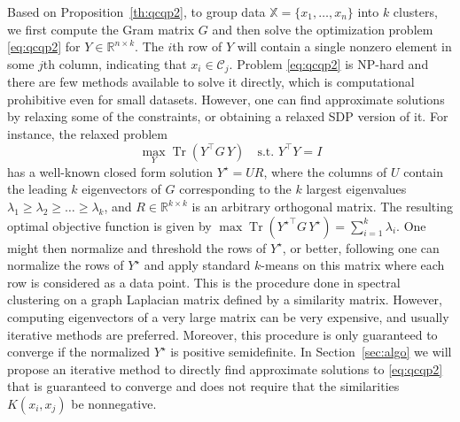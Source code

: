 \documentclass[aps,preprint,nofootinbib,floatfix]{revtex4-1}
\DeclareMathOperator{\Tr}{Tr}
\newcommand\kk{K}
\newcommand\C{{\mathcal{C}}}
\newcommand\Zt{Y}
\begin{document}
Based on Proposition~\ref{th:qcqp2}, to group data
$\mathbb{X} = \{ x_1,\dotsc,x_n \}$
into  $k$ clusters, we first compute the Gram matrix
$G$ and then 
solve the optimization problem \eqref{eq:qcqp2} for $\Zt \in
\mathbb{R}^{n\times k}$. The $i$th row
of $\Zt$ will contain a single nonzero element in some $j$th column,
indicating that $x_i \in \C_j$. 
Problem \eqref{eq:qcqp2} is NP-hard and there
are few methods
available to solve it directly,
which is computational prohibitive even for small datasets.
However, one can find approximate solutions by relaxing some 
of the constraints, or obtaining a relaxed SDP version of it.
For instance, the relaxed problem
\begin{equation}
\max_{Y} \Tr \left( Y^\top G \, Y \right) \quad \mbox{s.t. $Y^\top Y = I$}
\end{equation}
has a well-known closed form solution $Y^\star = U R$, where the
columns of $U$ contain the leading $k$ eigenvectors of $G$ corresponding
to the $k$ largest eigenvalues $\lambda_1\ge \lambda_2\ge\dotsc\ge\lambda_k$, 
and
$R \in \mathbb{R}^{k\times k}$ is an arbitrary orthogonal matrix. 
The resulting
optimal objective function is given by
$\max \Tr \left( {Y^\star}^\top G \, Y^\star \right)  = 
\sum_{i=1}^k \lambda_i$. One might then normalize and threshold the rows
of $Y^\star$, or better, following \cite{NgJordan} one can normalize the
rows of $Y^\star$ and apply standard $k$-means on this matrix where each
row is considered as a data point.
This is the procedure done in spectral clustering on a graph Laplacian
matrix defined by a similarity matrix.
However, computing eigenvectors of a very large matrix
can be very expensive, and usually iterative methods are preferred. Moreover,
this procedure is only guaranteed to converge if the normalized $Y^\star$ is
positive semidefinite.
In Section~\ref{sec:algo} we will propose an iterative method to directly 
find approximate solutions to \eqref{eq:qcqp2} that is guaranteed to
converge and does not require that the similarities $\kk(x_i,x_j)$ be
nonnegative.
\end{document}
